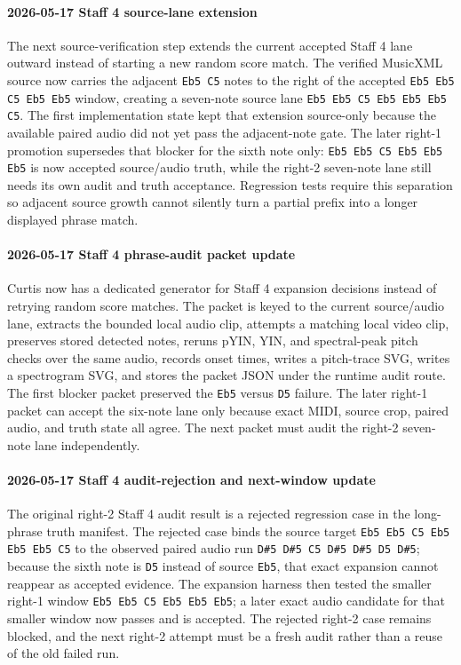 \paragraph{2026-05-17 Staff 4 source-lane extension} The next source-verification step extends the current accepted Staff 4 lane outward instead of starting a new random score match. The verified MusicXML source now carries the adjacent \texttt{Eb5 C5} notes to the right of the accepted \texttt{Eb5 Eb5 C5 Eb5 Eb5} window, creating a seven-note source lane \texttt{Eb5 Eb5 C5 Eb5 Eb5 Eb5 C5}. The first implementation state kept that extension source-only because the available paired audio did not yet pass the adjacent-note gate. The later right-1 promotion supersedes that blocker for the sixth note only: \texttt{Eb5 Eb5 C5 Eb5 Eb5 Eb5} is now accepted source/audio truth, while the right-2 seven-note lane still needs its own audit and truth acceptance. Regression tests require this separation so adjacent source growth cannot silently turn a partial prefix into a longer displayed phrase match.

\paragraph{2026-05-17 Staff 4 phrase-audit packet update} Curtis now has a dedicated generator for Staff 4 expansion decisions instead of retrying random score matches. The packet is keyed to the current source/audio lane, extracts the bounded local audio clip, attempts a matching local video clip, preserves stored detected notes, reruns pYIN, YIN, and spectral-peak pitch checks over the same audio, records onset times, writes a pitch-trace SVG, writes a spectrogram SVG, and stores the packet JSON under the runtime audit route. The first blocker packet preserved the \texttt{Eb5} versus \texttt{D5} failure. The later right-1 packet can accept the six-note lane only because exact MIDI, source crop, paired audio, and truth state all agree. The next packet must audit the right-2 seven-note lane independently.

\paragraph{2026-05-17 Staff 4 audit-rejection and next-window update} The original right-2 Staff 4 audit result is a rejected regression case in the long-phrase truth manifest. The rejected case binds the source target \texttt{Eb5 Eb5 C5 Eb5 Eb5 Eb5 C5} to the observed paired audio run \texttt{D\#5 D\#5 C5 D\#5 D\#5 D5 D\#5}; because the sixth note is \texttt{D5} instead of source \texttt{Eb5}, that exact expansion cannot reappear as accepted evidence. The expansion harness then tested the smaller right-1 window \texttt{Eb5 Eb5 C5 Eb5 Eb5 Eb5}; a later exact audio candidate for that smaller window now passes and is accepted. The rejected right-2 case remains blocked, and the next right-2 attempt must be a fresh audit rather than a reuse of the old failed run.

